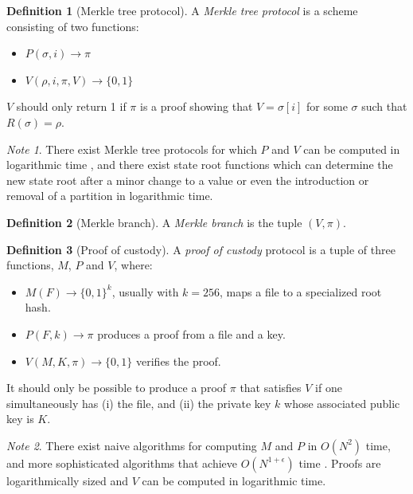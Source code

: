 \documentclass[11pt,a4paper]{report}
\theoremstyle{plain}
\theoremstyle{definition}
\newtheorem{defn}{Definition}[chapter]
\theoremstyle{remark}
\newtheorem*{note}{Note}
\begin{document}
\begin{defn}[Merkle tree protocol]
A \emph{Merkle tree protocol} is a scheme consisting of two functions:
\begin{itemize}
\item
$P(\sigma, i) \rightarrow \pi$
\item
$V(\rho, i, \pi, V) \rightarrow \{0, 1\}$
\end{itemize}
$V$ should only return 1 if $\pi$ is a proof showing that $V = \sigma[i]$ for some $\sigma$ such that $R(\sigma) = \rho$.
\end{defn}

\begin{note}
There exist Merkle tree protocols for which $P$ and $V$ can be computed in logarithmic time \cite{merkle}, and there exist state root functions which can determine the new state root after a minor change to a value or even the introduction or removal of a partition in logarithmic time.
\end{note}

\begin{defn}[Merkle branch]
A \emph{Merkle branch} is the tuple $(V, \pi)$.
\end{defn}

\begin{defn}[Proof of custody]
A \emph{proof of custody} protocol \cite{zamfirpoc} is a tuple of three functions, $M$, $P$ and $V$, where:

\begin{itemize}
\item
$M(F) \rightarrow \{0,1\}^k$, usually with $k = 256$, maps a file to a specialized root hash.
\item
$P(F, k) \rightarrow \pi$ produces a proof from a file and a key.
\item
$V(M, K, \pi) \rightarrow \{0,1\}$ verifies the proof.
\end{itemize}

It should only be possible to produce a proof $\pi$ that satisfies $V$ if one simultaneously has (i) the file, and (ii) the private key $k$ whose associated public key is $K$.
\end{defn}

\begin{note}
There exist naive algorithms for computing $M$ and $P$ in $O(N^2)$ time, and more sophisticated algorithms that achieve $O(N^{1+\epsilon})$ time \cite{ffterasurecode}. Proofs are logarithmically sized and $V$ can be computed in logarithmic time.
\end{note}
\end{document}
